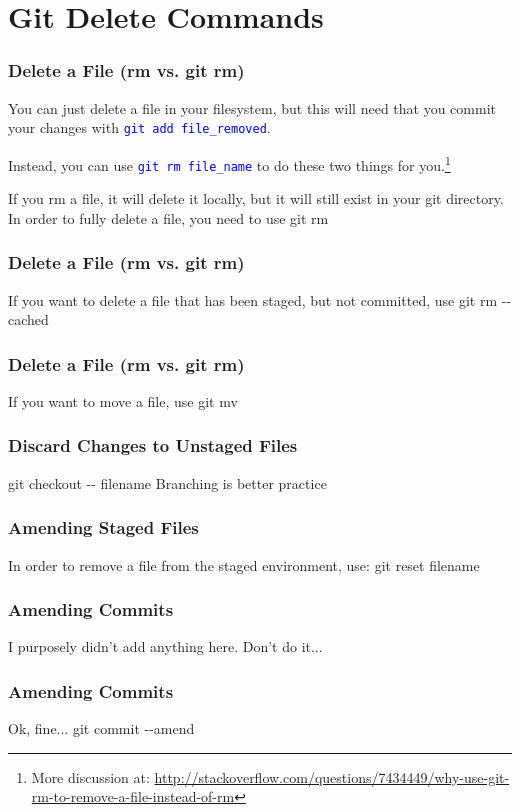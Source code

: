 
\section[Deleting]{Git Delete Commands}

\begin{frame}
\frametitle{\large Delete a File (rm vs. git rm)}

You can just delete a file in your filesystem, but this will need that you commit your changes with \textcolor{blue}{\texttt{git add file\_removed}}.

Instead, you can use \textcolor{blue}{\texttt{git rm file\_name}} to do these two things for you.\footnote{More discussion at: \url{http://stackoverflow.com/questions/7434449/why-use-git-rm-to-remove-a-file-instead-of-rm}}
\end{frame}

\begin{frame}
If you rm a file, it will delete it locally, but it will still exist in your git directory. In order to fully delete a file, you need to use git rm
\end{frame}
\note{}

\begin{frame}
\frametitle{\large Delete a File (rm vs. git rm)}
If you want to delete a file that has been staged, but not committed, use git rm -{}-cached
\end{frame}
\note{}

\begin{frame}
\frametitle{\large Delete a File (rm vs. git rm)}
If you want to move a file, use git mv
\end{frame}
\note{}

\begin{frame}
\frametitle{\large Discard Changes to Unstaged Files}
git checkout -{}- filename
Branching is better practice
\end{frame}
\note{}

\begin{frame}
\frametitle{\large Amending Staged Files}
In order to remove a file from the staged environment, use:
git reset filename
\end{frame}
\note{}

\begin{frame}
\frametitle{\large Amending Commits}
I purposely didn't add anything here. Don't do it...
\end{frame}
\note{}

\begin{frame}
\frametitle{\large Amending Commits}
Ok, fine...
git commit -{}-amend
\end{frame}
\note{}